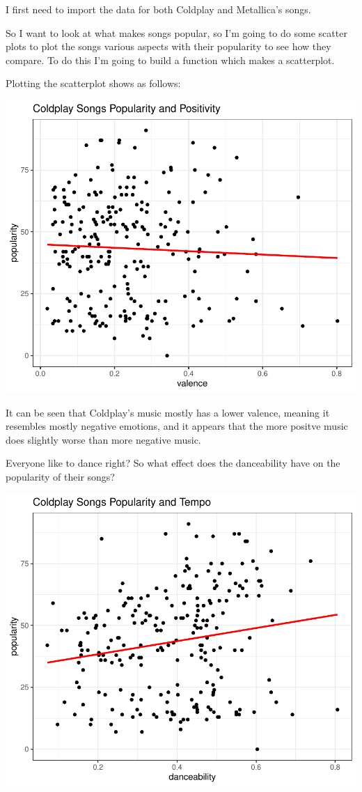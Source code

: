 \documentclass[11pt,preprint, authoryear]{elsarticle}
\numberwithin{equation}{section}
\numberwithin{figure}{section}
\numberwithin{table}{section}
\begin{document}
I first need to import the data for both Coldplay and Metallica's songs.

So I want to look at what makes songs popular, so I'm going to do some
scatter plots to plot the songs various aspects with their popularity to
see how they compare. To do this I'm going to build a function which
makes a scatterplot.

Plotting the scatterplot shows as follows:

\includegraphics{Question_3_files/figure-latex/unnamed-chunk-2-1.pdf}

It can be seen that Coldplay's music mostly has a lower valence, meaning
it resembles mostly negative emotions, and it appears that the more
positve music does slightly worse than more negative music.

Everyone like to dance right? So what effect does the danceability have
on the popularity of their songs?

\includegraphics{Question_3_files/figure-latex/unnamed-chunk-3-1.pdf}
\end{document}
